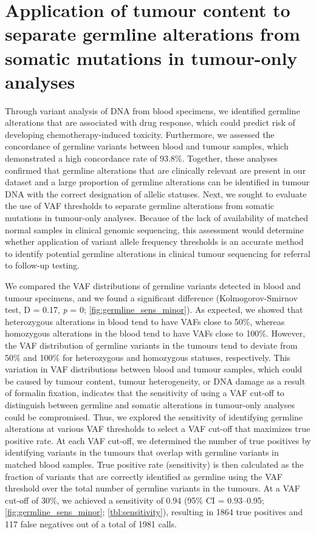 \section{Application of tumour content to separate germline alterations from somatic mutations in tumour-only analyses}
\label{sec:Applicationoftumourcontenttoseparategermlinealterationsfromsomaticmutationsintumour-onlyanalyses}

Through variant analysis of DNA from blood specimens, we identified germline alterations that are associated with drug response, which could predict risk of developing chemotherapy-induced toxicity. Furthermore, we assessed the concordance of germline variants between blood and tumour samples, which demonstrated a high concordance rate of 93.8\%. Together, these analyses confirmed that germline alterations that are clinically relevant are present in our dataset and a large proportion of germline alterations can be identified in tumour DNA with the correct designation of allelic statuses. Next, we sought to evaluate the use of VAF thresholds to separate germline alterations from somatic mutations in tumour-only analyses. Because of the lack of availability of matched normal samples in clinical genomic sequencing, this assessment would determine whether application of variant allele frequency thresholds is an accurate method to identify potential germline alterations in clinical tumour sequencing for referral to follow-up testing.

We compared the VAF distributions of germline variants detected in blood and tumour specimens, and we found a significant difference (Kolmogorov-Smirnov test, D = 0.17, \textit{p} = 0; \autoref{fig:germline_sens_minor}). As expected, we showed that heterozygous alterations in blood tend to have VAFs close to 50\%, whereas homozygous alterations in the blood tend to have VAFs close to 100\%. However, the VAF distribution of germline variants in the tumours tend to deviate from 50\% and 100\% for heterozygous and homozygous statuses, respectively. This variation in VAF distributions between blood and tumour samples, which could be caused by tumour content, tumour heterogeneity, or DNA damage as a result of formalin fixation, indicates that the sensitivity of using a VAF cut-off to distinguish between germline and somatic alterations in tumour-only analyses could be compromised. Thus, we explored the sensitivity of identifying germline alterations at various VAF thresholds to select a VAF cut-off that maximizes true positive rate. At each VAF cut-off, we determined the number of true positives by identifying variants in the tumours that overlap with germline variants in matched blood samples. True positive rate (sensitivity) is then calculated as the fraction of variants that are correctly identified as germline using the VAF threshold over the total number of germline variants in the tumours. At a VAF cut-off of 30\%, we achieved a sensitivity of 0.94 (95\% CI = 0.93--0.95; \autoref{fig:germline_sens_minor}; \autoref{tbl:sensitivity}), resulting in 1864 true positives and 117 false negatives out of a total of 1981 calls.

